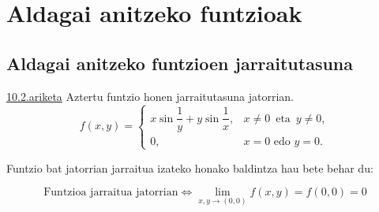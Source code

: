 \chapter{Aldagai anitzeko funtzioak}
\section{Aldagai anitzeko funtzioen jarraitutasuna}
\underline{10.2.ariketa} Aztertu funtzio honen jarraitutasuna jatorrian.
$$f(x,y) = \left\{ \begin{array}{cl}
		x\sin \dfrac{1}{y} +y \sin \dfrac{1}{x},  &  x \neq 0 \, \mbox{ eta } \, y \neq 0, \\
                 0,	                                &  x=0 \mbox{ edo } y=0.
		   \end{array} \right. $$
		   
		 
Funtzio bat jatorrian jarraitua izateko honako baldintza hau bete behar du:

\begin{equation*}
    \text{Funtzioa jarraitua jatorrian}
    \Longleftrightarrow
    \boxed{\lim_{x,y \to (0,0)}f(x,y)=f(0,0)=0}
\end{equation*}
	   
